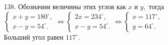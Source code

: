 138. Обозначим величины этих углов как $x$ и $y,$ тогда $\begin{cases} x+y=180^\circ,\\x-y=54^\circ.\end{cases}\Leftrightarrow
\begin{cases} 2x=234^\circ,\\x-y=54^\circ.\end{cases}\Leftrightarrow\begin{cases} x=117^\circ,\\y=64^\circ.\end{cases}$\\
Больший угол равен $117^\circ.$\\
